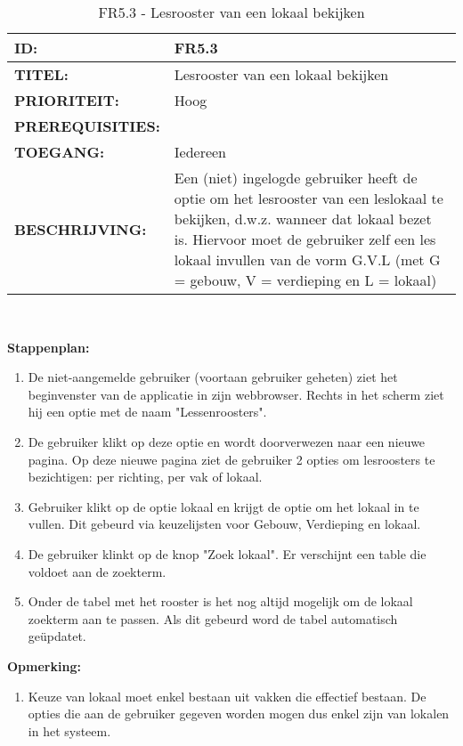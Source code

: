         
\noindent\begin{table}[H]
            \begin{tabular}{l | p{10cm}}
                \textbf{ID:} & FR5.3 \\ \hline
                \textbf{TITEL:} & Lesrooster van een lokaal bekijken\\ \hline
                \textbf{PRIORITEIT:} &  Hoog \\ \hline
                \textbf{PREREQUISITIES:} & \\ \hline
                \textbf{TOEGANG:} &  Iedereen \\ \hline
                \textbf{BESCHRIJVING:} & Een (niet) ingelogde gebruiker heeft de optie om het lesrooster van een leslokaal te bekijken, d.w.z. wanneer dat lokaal bezet is. Hiervoor moet de gebruiker zelf een les lokaal invullen van de vorm G.V.L (met G = gebouw, V = verdieping en L = lokaal)\\
            \end{tabular}\\
            \caption{FR5.3 - Lesrooster van een lokaal bekijken}
            \label{tab:FR5.3 - Lesrooster van een lokaal bekijken}
        \end{table}
        
\textbf{Stappenplan:}
	\begin{enumerate}
	\item De niet-aangemelde gebruiker (voortaan gebruiker geheten) ziet het beginvenster van de applicatie in zijn webbrowser. Rechts in het scherm ziet hij een optie met de naam "Lessenroosters".
		\item De gebruiker klikt op deze optie en wordt doorverwezen naar een nieuwe pagina. Op deze nieuwe pagina ziet de gebruiker 2 opties om lesroosters te bezichtigen: per richting, per vak of lokaal.
		\item Gebruiker klikt op de optie lokaal en krijgt de optie om het lokaal in te vullen. Dit gebeurd via keuzelijsten voor Gebouw, Verdieping en lokaal.
		\item De gebruiker klinkt  op de knop "Zoek lokaal". Er verschijnt een table die voldoet aan de zoekterm. 
		\item Onder de tabel met het rooster is het nog altijd mogelijk om de lokaal zoekterm aan te passen. Als dit gebeurd word de tabel automatisch geüpdatet. 		
	\end{enumerate}

\textbf{Opmerking:}
	\begin{enumerate}
	\item Keuze van lokaal moet enkel bestaan uit vakken die effectief bestaan. De opties die aan de gebruiker gegeven worden mogen dus enkel zijn van lokalen in het systeem.
	\end{enumerate}  

